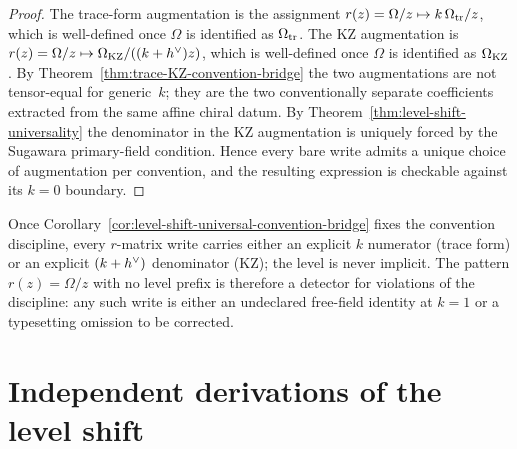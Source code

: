 \begin{proof}
The trace-form augmentation is the assignment
$r(z) = \Omega/z \mapsto k\,\Omega_{\mathrm{tr}}/z$, which is well-defined once
$\Omega$ is identified as $\Omega_{\mathrm{tr}}$. The KZ augmentation is
$r(z) = \Omega/z \mapsto \Omega_{\mathrm{KZ}}/((k + h^{\vee}) z)$, which is well-defined
once $\Omega$ is identified as $\Omega_{\mathrm{KZ}}$. By
Theorem~\ref{thm:trace-KZ-convention-bridge} the two augmentations are
not tensor-equal for generic~$k$; they are the two conventionally
separate coefficients extracted from the same affine chiral datum. By
Theorem~\ref{thm:level-shift-universality} the denominator in the KZ
augmentation is uniquely forced by the Sugawara primary-field
condition. Hence every bare write admits a unique choice of
augmentation per convention, and the resulting expression is checkable
against its $k=0$ boundary.
\end{proof}

\begin{remark}
\label{rem:level-prefix-grep-detector}
Once
Corollary~\ref{cor:level-shift-universal-convention-bridge} fixes
the convention discipline, every $r$-matrix write carries either
an explicit $k$ numerator (trace form) or an explicit $(k+h^{\vee})$
denominator (KZ); the level is never implicit. The pattern
$r(z) = \Omega/z$ with no level prefix is therefore a detector for
violations of the discipline: any such write is either an undeclared
free-field identity at $k=1$ or a typesetting omission to be
corrected.
\end{remark}

\section{Independent derivations of the level shift}
\label{sec:level-shift-independent-verification}


